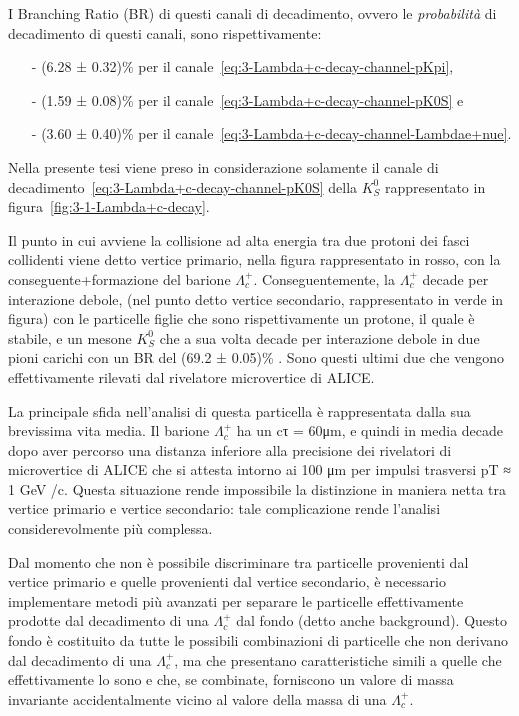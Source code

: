 I Branching Ratio (BR) di questi canali di decadimento, ovvero le \textit{probabilità} di decadimento di questi canali, sono rispettivamente:
\begin{itemize}
    \item[-] \qty[]{}{} (6.28 ± 0.32)\% per il canale~\ref{eq:3-Lambda+c-decay-channel-pKpi},

    \item[-] \qty[]{}{} (1.59 ± 0.08)\% per il canale~\ref{eq:3-Lambda+c-decay-channel-pK0S} e

    \item[-] \qty[separate-uncertainty=true]{}{} (3.60 ± 0.40)\% per il canale~\ref{eq:3-Lambda+c-decay-channel-Lambdae+nue}.
\end{itemize}

Nella presente tesi viene preso in considerazione solamente il canale di decadimento~\ref{eq:3-Lambda+c-decay-channel-pK0S} della $K^{0}_{S}$ rappresentato in
figura~\ref{fig:3-1-Lambda+c-decay}.

Il punto in cui avviene la collisione ad alta energia tra due protoni dei fasci collidenti viene detto vertice primario, nella figura rappresentato in rosso, con la conseguente+formazione del barione $\Lambda_{c}^{+}$. Conseguentemente, la $\Lambda_{c}^{+}$ decade per interazione debole, (nel punto detto vertice secondario, rappresentato in verde in figura) con le particelle figlie che sono rispettivamente un protone, il quale è stabile, e un mesone $K^{0}_{S}$ che a sua volta decade per interazione debole in due pioni carichi con un BR del (69.2 ± 0.05)\% . Sono questi ultimi due che vengono effettivamente rilevati dal rivelatore microvertice di ALICE.

La principale sfida nell’analisi di questa particella è rappresentata dalla sua brevissima vita media. Il barione $\Lambda_{c}^{+}$ ha un cτ = 60μm, e quindi in media decade dopo aver percorso una distanza inferiore alla precisione dei rivelatori di microvertice di ALICE che si attesta intorno ai 100 μm per impulsi trasversi pT ≈ 1 GeV /c. Questa situazione rende impossibile la distinzione in maniera netta tra vertice primario e vertice secondario: tale complicazione rende l’analisi considerevolmente più complessa.

Dal momento che non è possibile discriminare tra particelle provenienti dal vertice primario e quelle provenienti dal vertice secondario, è necessario implementare metodi più avanzati per separare le particelle effettivamente prodotte dal decadimento di una $\Lambda_{c}^{+}$ dal fondo (detto anche background). Questo fondo è costituito da tutte le possibili combinazioni di particelle che non derivano dal decadimento di una $\Lambda_{c}^{+}$, ma che presentano caratteristiche simili a quelle che effettivamente lo sono e che, se combinate, forniscono un valore di massa invariante accidentalmente vicino al valore della massa di una $\Lambda_{c}^{+}$.


